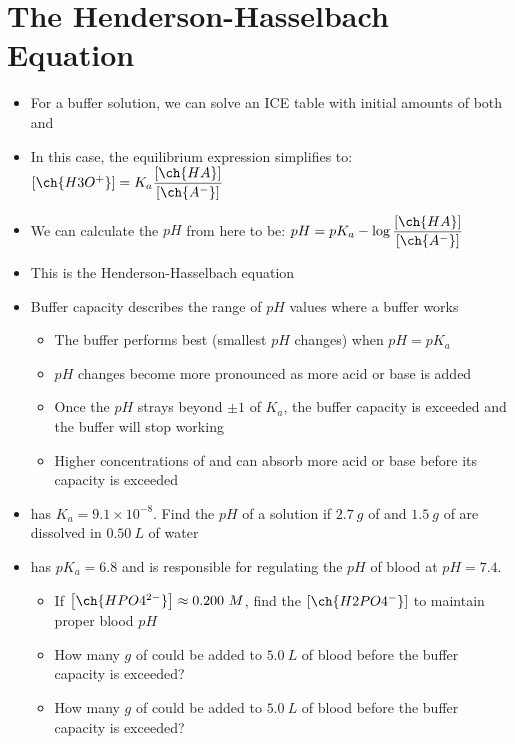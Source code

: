 \documentclass[12pt, openany, letterpaper]{memoir}
\begin{document}
\section{The Henderson-Hasselbach Equation}
\begin{itemize}
	\item For a buffer solution, we can solve an ICE table with initial amounts of both  and 
	\item In this case, the equilibrium expression simplifies to: $\left[\ch{H3O^+}\right]=K_a\dfrac{\left[\ch{HA}\right]}{\left[\ch{A^-}\right]}$
	\item We can calculate the $pH$ from here to be: $pH = pK_a-\log\dfrac{\left[\ch{HA}\right]}{\left[\ch{A^-}\right]}$
	\item This is the Henderson-Hasselbach equation
	\item Buffer capacity describes the range of $pH$ values where a buffer works
	\begin{itemize}
		\item The buffer performs best (smallest $pH$ changes) when $pH=pK_a$
		\item $pH$ changes become more pronounced as more acid or base is added
		\item Once the $pH$ strays beyond $\pm 1$ of $K_a$, the buffer capacity is exceeded and the buffer will stop working
		\item Higher concentrations of  and  can absorb more acid or base before its capacity is exceeded
	\end{itemize}
	\item {} has $K_a=9.1\times10^{-8}$. Find the $pH$ of a solution if $2.7~g$ of  and $1.5~g$ of  are dissolved in $0.50~L$ of water
	\item {} has $pK_a=6.8$ and is responsible for regulating the $pH$ of blood at $pH=7.4$. 
	\begin{itemize}
		\item If $\left[\ch{HPO4^{2-}}\right]\approx0.200~M$, find the $\left[\ch{H2PO4^{-}}\right]$ to maintain proper blood $pH$
		\item How many $g$ of  could be added to $5.0~L$ of blood before the buffer capacity is exceeded?
		\item How many $g$ of  could be added to $5.0~L$ of blood before the buffer capacity is exceeded?	
	\end{itemize}
\end{itemize}
\end{document}
